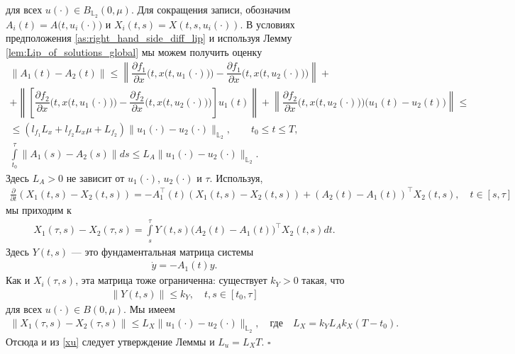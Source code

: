 \documentclass[../main.tex]{subfiles}
\begin{document}
	для всех $u(\cdot) \in B_{\mathbb{L}_2}(0,\mu)$. Для сокращения записи, обозначим $A_i(t) = A\big(t, u_i(\cdot)\big) $ и $ X_i(t,s) = X(t, s, u_i(\cdot))$. В условиях предположения \ref{as:right_hand_side_diff_lip} и используя Лемму \ref{lem:Lip_of_solutions_global} мы можем получить оценку
	\begin{gather*}
		\| A_1(t) - A_2(t) \| \leqslant 
		\left\| \dfrac{\partial f_1}{\partial x} \Big(t,x\big(t,u_1(\cdot)\big)\Big) - \dfrac{\partial f_1}{\partial x} \Big(t,x\big(t,u_2(\cdot)\big)\Big) \right\| + \\ +
		\left\| \left[ \dfrac{\partial f_2}{\partial x}\Big(t,x\big(t,u_1(\cdot)\big)\Big)  - \dfrac{\partial f_2}{\partial x}\Big(t,x\big(t,u_2(\cdot)\big)\Big) \right] u_1(t) \right\| + 
		\left\| \dfrac{\partial f_2}{\partial x}\Big(t,x\big(t,u_2(\cdot)\big)\Big) \Big(u_1(t) - u_2(t)\Big) \right\| \leqslant \\ \leqslant
		(l_{f_1} L_x  + l_{f_2} L_x \mu   +  L_{f_2} ) \| u_1(\cdot) - u_2(\cdot) \|_{\mathbb{L}_2}, \qquad t_0 \leqslant t \leqslant T,\\
		\int\limits_{t_0}^{\tau} \|A_1(s) - A_2(s) \| ds \leqslant L_A \| u_1(\cdot) - u_2(\cdot) \|_{\mathbb{L}_2}. 
	\end{gather*}
	Здесь $L_A>0$ не зависит от $u_1(\cdot)$, $u_2(\cdot)$ и $\tau$. Используя,
	\begin{gather*}
		\frac{\partial}{\partial t} \left(X_1(t,s) - X_2(t,s) \right) = -A_1^{\top}(t) \left(X_1(t,s) - X_2(t,s) \right) + (A_2(t) - A_1(t))^{\top} X_2(t,s), \quad t \in [s,\tau]
	\end{gather*}
	мы приходим к
	\begin{gather*}
		X_1(\tau,s) - X_2(\tau,s) = \int\limits_s^{\tau} Y(t,s) \big(A_2(t) - A_1(t)\big)^{\top} X_2(t,s) dt.
	\end{gather*}
	Здесь $Y(t,s)$ --- это фундаментальная матрица системы 
	\begin{gather*}
		\dot{y} = -A_1(t) y.
	\end{gather*}
	Как и $X_i(\tau,s)$, эта матрица тоже ограниченна: существует $k_Y>0$ такая, что
	\begin{gather*}
		\|Y(t,s)\| \leqslant k_Y, \quad t,s \in [t_0, \tau]
	\end{gather*}
	для всех $u(\cdot) \in B(0,\mu)$. Мы имеем
	\begin{gather*}
		\| X_1(\tau,s) - X_2(\tau,s) \| \leqslant L_X \| u_1(\cdot) - u_2(\cdot) \|_{\mathbb{L}_2}, \quad \mbox{где} \quad L_X = k_Y L_A k_X (T - t_0) .
	\end{gather*}
	Отсюда и из \eqref{xu} следует утверждение Леммы и $L_u = L_X T$.
	\hfill$\square$\\[1ex]%
	
\end{document}
